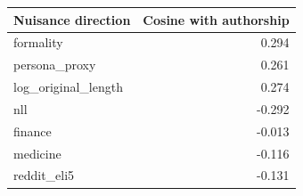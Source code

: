 \begin{tabular}{lr}
\toprule
Nuisance direction & Cosine with authorship \\
\midrule
formality & 0.294 \\
persona\_proxy & 0.261 \\
log\_original\_length & 0.274 \\
nll & -0.292 \\
finance & -0.013 \\
medicine & -0.116 \\
reddit\_eli5 & -0.131 \\
\bottomrule
\end{tabular}
